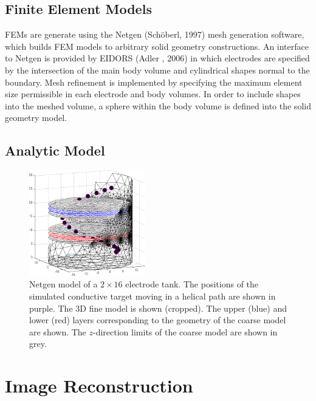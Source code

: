 \documentclass[12pt,draft]{iopart}
\begin{document}
\subsection{Finite Element Models}

FEMs are generate using the Netgen (Sch\"oberl, 1997) mesh
generation software, which builds FEM models to arbitrary
solid geometry constructions. An interface to Netgen is
provided by EIDORS (Adler \etal, 2006) in which electrodes
are specified by the intersection of the main body volume
and cylindrical shapes normal to the boundary. Mesh refinement
is implemented by specifying the maximum element size permissible
in each electrode and body volumes. In order to include shapes
into the meshed volume, a sphere within the body volume 
is defined into the solid geometry model.

\subsection{Analytic Model}


\begin{figure}[tbh]
\begin{center}
 \includegraphics[width= 0.45\textwidth, bb=0 0 466 278]{../../tutorial/dual_model/centre_slice02a.png}
\caption{ \label{fig:dual_model}
\small
Netgen model of a $2\times 16$ electrode tank. The positions of the simulated
conductive target moving in a helical path are shown in purple. The
3D fine model is shown (cropped). The upper (blue) and lower (red)
layers corresponding to the geometry of the coarse model are shown. The
$z$-direction limits of the coarse model are shown in grey.
}
\end{center}

\end{figure}

\section{Image Reconstruction}
\end{document}
